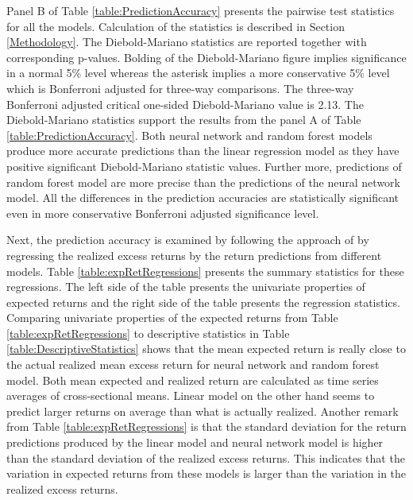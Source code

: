 \documentclass[12pt]{article}
\begin{document}
Panel B of Table \ref{table:PredictionAccuracy} presents the pairwise \citet{Diebold1995} test statistics for all the models. Calculation of the statistics is described in Section \ref{Methodology}. The Diebold-Mariano statistics are reported together with corresponding p-values. Bolding of the Diebold-Mariano figure implies significance in a normal 5\% level whereas the asterisk implies a more conservative 5\% level which is Bonferroni adjusted for three-way comparisons. The three-way Bonferroni adjusted critical one-sided Diebold-Mariano value is 2.13. The Diebold-Mariano statistics support the results from the panel A of Table \ref{table:PredictionAccuracy}. Both neural network and random forest models produce more accurate predictions than the linear regression model as they have positive significant Diebold-Mariano statistic values. Further more, predictions of random forest model are more precise than the predictions of the neural network model. All the differences in the prediction accuracies are statistically significant even in more conservative Bonferroni adjusted significance level. \par

Next, the prediction accuracy is examined by following the approach of \citet{Lewellen2015} by regressing the realized excess returns by the return predictions from different models. Table \ref{table:expRetRegressions} presents the summary statistics for these regressions. The left side of the table presents the univariate properties of expected returns and the right side of the table presents the regression statistics. Comparing univariate properties of the expected returns from Table \ref{table:expRetRegressions} to descriptive statistics in Table \ref{table:DescriptiveStatistics} shows that the mean expected return is really close to the actual realized mean excess return for neural network and random forest model. Both mean expected and realized return are calculated as time series averages of cross-sectional means. Linear model on the other hand seems to predict larger returns on average than what is actually realized. Another remark from Table \ref{table:expRetRegressions} is that the standard deviation for the return predictions produced by the linear model and neural network model is higher than the standard deviation of the realized excess returns. This indicates that the variation in expected returns from these models is larger than the variation in the realized excess returns. \par
\end{document}
